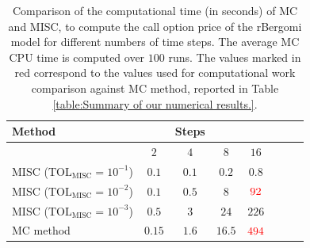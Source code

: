 \FloatBarrier
\begin{table}[h!]
	\centering
	\begin{tabular}{l*{6}{c}r}
	\toprule[1.5pt]
	Method & & Steps  & &     \\
	\hline	
         & $2$ & $4$ & $8$ & $16$ &   \\
		\hline
		MISC ($\text{TOL}_{\text{MISC}}=10^{-1}$)  & $0.1$ & $0.1$ & $0.2$ & $0.8$ \\
		MISC ($\text{TOL}_{\text{MISC}}=10^{-2}$)  & $0.1$ & $0.5$ & $8$ & $\red{92}$ \\
		MISC ($\text{TOL}_{\text{MISC}}=10^{-3}$)  & $0.5$ & $3$ & $24$ & $226$ \\
%		
		\hline
		MC method   & $ 0.15
		
		$  & $  1.6$  & $  16.5$ & $ \red{494}
		$  \\	
%		
		
		\bottomrule[1.25pt]
	\end{tabular}
	\caption{Comparison of the computational time (in seconds) of  MC and MISC, to compute the call option price of the rBergomi model for different numbers of time steps. The average  MC CPU time is computed over $100$ runs. The values marked in red correspond to the values used for computational work comparison against MC method, reported in Table \ref{table:Summary of our numerical results.}. }
	\label{Comparsion of the computational time of  MC and MISC, used to compute Call option price of rBergomi model for different number of time steps. Case set3}
\end{table}
%




